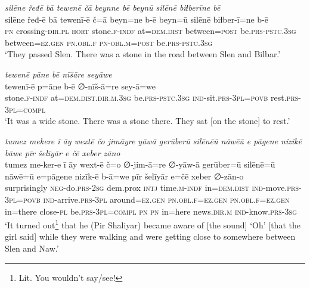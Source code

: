 \ea \label{ŽP.167}
\textit{silēne řeđē bā tewenē čā beynne bē beynū silēnē biɫberīne bē} \\ 
\gll silēne řeđ-ē bā tewenī-ē č=ā beyn=ne b-ē beyn=ū silēnē biɫber-ī=ne b-ē \\ 
 \textsc{pn} crossing\textsc{-dir}\textsc{.pl} \textsc{hort} stone\textsc{.f}\textsc{-indf} at=\textsc{dem.dist} between\textsc{=\textsc{post}} be\textsc{.prs}\textsc{-pstc}\textsc{.3sg} between\textsc{\textsc{=ez.gen}} \textsc{pn}\textsc{.obl}\textsc{.f} \textsc{pn}\textsc{-obl}\textsc{.m}\textsc{=\textsc{post}} be\textsc{.prs}\textsc{-pstc}\textsc{.3sg} \\ 
\glt `They passed Slen. There was a stone in the road between Slen and Bilbar.'
\z 
 
\ea \label{ŽP.171}
\textit{tewenē pāne bē nīšāre seyāwe} \\ 
\gll tewenī-ē p=āne b-ē ∅-nīš-ā=re sey-ā=we \\ 
 stone\textsc{.f}\textsc{-indf} at=\textsc{dem.dist}\textsc{.dir}\textsc{.m}\textsc{.3sg} be\textsc{.prs}\textsc{-pstc}\textsc{.3sg} \textsc{ind-}sit\textsc{.prs}\textsc{-3pl}\textsc{=\textsc{povb}} rest\textsc{.prs}\textsc{-3pl}\textsc{=compl} \\ 
\glt `It was a wide stone. There was a stone there. They sat [on the stone] to rest.'
\z 
 
\ea \label{ŽP.175}
\textit{tumez mekere ī āy wextē čo jimāyre yāwā gerūberū silēnēū nāwēū e pāgene nizīkē bāwe pīr šelīyār e čē xeber zāno} \\ 
\gll tumez me-ker-e ī āy wext-ē č=o ∅-jim-ā=re ∅-yāw-ā gerūber=ū silēnē=ū nāwē=ū e=pāgene nizīk-ē b-ā=we pīr šelīyār e=čē xeber ∅-zān-o \\ 
 surprisingly \textsc{neg-}do\textsc{.prs}-\textsc{2sg} dem.prox \textsc{intj} time\textsc{.m}\textsc{-indf} in=\textsc{dem.dist} \textsc{ind-}move\textsc{.prs}\textsc{-3pl}\textsc{=\textsc{povb}} \textsc{ind-}arrive\textsc{.prs}\textsc{-3pl} around\textsc{\textsc{=ez.gen}} \textsc{pn}\textsc{.obl}\textsc{.f}\textsc{\textsc{=ez.gen}} \textsc{pn}\textsc{.obl}\textsc{.f}\textsc{\textsc{=ez.gen}} in=there close\textsc{\textsc{-pl}} be\textsc{.prs}\textsc{-3pl}\textsc{=compl} \textsc{pn} \textsc{pn} in=here news\textsc{.dir}\textsc{.m} \textsc{ind-}know\textsc{.prs}\textsc{-3sg} \\ 
\glt `It turned out\footnote{Lit. You wouldn’t say/see!} that he (Pir Shaliyar) became aware of [the sound] ‘Oh’ [that the girl said] while they were walking and were getting close to somewhere between Slen and Naw.'
\z 
 
